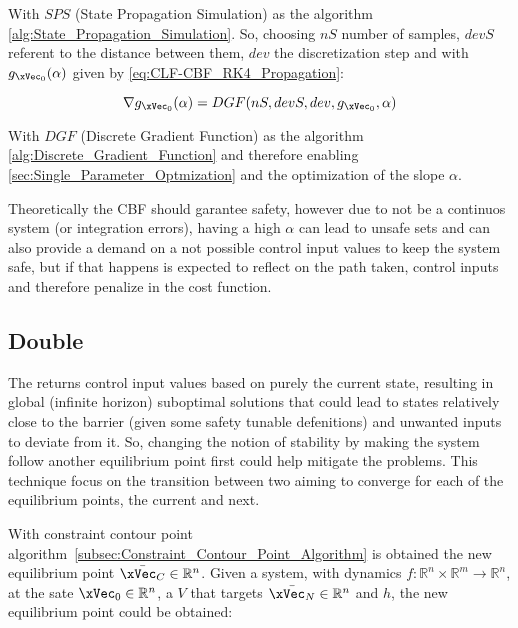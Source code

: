 With \(SPS\) (State Propagation Simulation) as the algorithm \ref{alg:State_Propagation_Simulation}. So, choosing \(nS\) number of samples, \(devS\) referent to the distance between them, \(dev\) the discretization step and with \(g_{\xVec_0}(\alpha)\) given by \ref{eq:CLF-CBF_RK4_Propagation}:

\begin{equation}
    \nabla g_{\xVec_0}(\alpha) = DGF(nS,devS,dev, g_{\xVec_0},\alpha)  
    \label{eq:discrete_gradient_function}
\end{equation}

With \(DGF\) (Discrete Gradient Function) as the algorithm \ref{alg:Discrete_Gradient_Function}  and therefore enabling \ref{sec:Single_Parameter_Optmization} and the optimization of the slope \(\alpha\).\par  
Theoretically the CBF should garantee safety, however due to not be a continuos system (or integration errors), having a high \(\alpha\) can lead to unsafe sets and can also provide a demand on a not possible control input values to keep the system safe, but if that happens is expected to reflect on the path taken, control inputs and therefore penalize in the cost function.

\subsection{Double }
\label{subsec:Double_CLF}


The  returns control input values based on purely the current state, resulting in global (infinite horizon) suboptimal solutions that could lead to states relatively close to the barrier (given some safety tunable defenitions) and unwanted inputs to deviate from it. So, changing the notion of stability by making the system follow another equilibrium point first could help mitigate the problems. This technique focus on the transition between two  aiming to converge for each of the equilibrium points, the current and next. \par


With constraint contour point algorithm~\ref{subsec:Constraint_Contour_Point_Algorithm} is obtained the new equilibrium point \(\bar{\xVec_C} \in \mathbb{R}^n\). Given a system, with dynamics \(f:\mathbb{R}^n \times \mathbb{R}^m \rightarrow \mathbb{R}^n \), at the sate \(\xVec_0 \in \mathbb{R}^n\), a  \(V\) that targets \(\bar{\xVec_N} \in \mathbb{R}^n\) and  \(h\), the new equilibrium point could be obtained:

